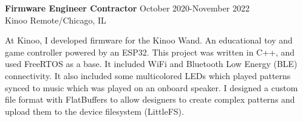 \textbf{Firmware Engineer Contractor} \hfill October 2020-November 2022 \\
Kinoo \hfill Remote/Chicago, IL
\begin{description} \itemsep -2pt %
\item At Kinoo, I developed firmware for the Kinoo Wand. An educational toy and
game controller powered by an ESP32. This project was written in C++, and used
FreeRTOS as a base. It included WiFi and Bluetooth Low Energy (BLE)
connectivity. It also included some multicolored LEDs which played patterns
synced to music which was played on an onboard speaker. I designed a custom file
format with FlatBuffers to allow designers to create complex patterns and upload
them to the device filesystem (LittleFS).
\end{description}
